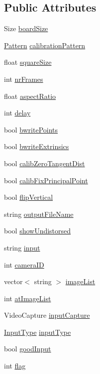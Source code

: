 \subsection*{Public Attributes}
\begin{DoxyCompactItemize}
\item 
Size \mbox{\hyperlink{class_settings_a5030a7164df923bb3b86dd7a0fc9af30}{board\+Size}}
\item 
\mbox{\hyperlink{class_settings_a0e7117abd9427a6f8bc1d1d8d456b5c8}{Pattern}} \mbox{\hyperlink{class_settings_a94551b7ffe8ac60311b035b2905e9498}{calibration\+Pattern}}
\item 
float \mbox{\hyperlink{class_settings_a6c94708776ad1ce258fc44f2101f5941}{square\+Size}}
\item 
int \mbox{\hyperlink{class_settings_a7e6654cd0e51791ed687eaa85f8fc143}{nr\+Frames}}
\item 
float \mbox{\hyperlink{class_settings_af55c910308a0d773055d0b19261bb3b8}{aspect\+Ratio}}
\item 
int \mbox{\hyperlink{class_settings_a5fe947366441009187d633f9e4663256}{delay}}
\item 
bool \mbox{\hyperlink{class_settings_ab4aac97bdb5696d60b35a29c26497064}{bwrite\+Points}}
\item 
bool \mbox{\hyperlink{class_settings_af1ac412d660e25aea698c76fa88de57c}{bwrite\+Extrinsics}}
\item 
bool \mbox{\hyperlink{class_settings_a4bc7ff147d74721a3587ce6fcb64ef32}{calib\+Zero\+Tangent\+Dist}}
\item 
bool \mbox{\hyperlink{class_settings_a44397eea3f08a0c78808c38bdd716594}{calib\+Fix\+Principal\+Point}}
\item 
bool \mbox{\hyperlink{class_settings_ab6304f260b315d2820f755e1c3a052b5}{flip\+Vertical}}
\item 
string \mbox{\hyperlink{class_settings_a9468f1ad53e982f9541d76c8d3228900}{output\+File\+Name}}
\item 
bool \mbox{\hyperlink{class_settings_a935d6f27ee454e9fee63f8b662f48a06}{show\+Undistorsed}}
\item 
string \mbox{\hyperlink{class_settings_a9970d51ab47b6560ab11b267637b6219}{input}}
\item 
int \mbox{\hyperlink{class_settings_af32a5ff06192bde106c934e0361bcd7e}{camera\+ID}}
\item 
vector$<$ string $>$ \mbox{\hyperlink{class_settings_ae261128a69d1d3d2b0f5315aff8066c8}{image\+List}}
\item 
int \mbox{\hyperlink{class_settings_a80061aedf354e63cb6c4c1fb7c4a9055}{at\+Image\+List}}
\item 
Video\+Capture \mbox{\hyperlink{class_settings_abd5706146b34d3c32aef4025dcd2ec1b}{input\+Capture}}
\item 
\mbox{\hyperlink{class_settings_a5afe85d24b071973a7f248c05386f7f4}{Input\+Type}} \mbox{\hyperlink{class_settings_a89fb14ce9856fb642f18bb0f7c5b8868}{input\+Type}}
\item 
bool \mbox{\hyperlink{class_settings_a3b9fc27b555f982bd5b9ea5198e1f7e3}{good\+Input}}
\item 
int \mbox{\hyperlink{class_settings_aba5691e3e76525f93ea254e654ec3717}{flag}}
\end{DoxyCompactItemize}
